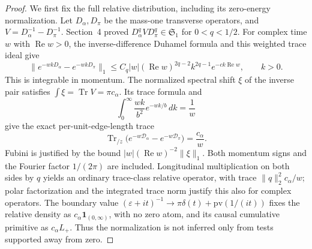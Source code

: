 \documentclass[11pt]{amsart}
\numberwithin{equation}{section}
\theoremstyle{remark}
\newcommand{\Tr}{\operatorname{Tr}}
\newcommand{\one}{\mathbf{1}}
\newcommand{\Sone}{\mathfrak{S}_1}
\newcommand{\Dcal}{\mathcal{D}}
\begin{document}
\begin{proof}
We first fix the full relative distribution, including its zero-energy normalization. Let $D_\alpha,D_\pi$ be the mass-one transverse operators, and $V=D_\alpha^{-1}-D_\pi^{-1}$. Section~4 proved $D^q_\alpha VD^q_\pi\in\Sone$ for $0<q<1/2$. For complex time $w$ with $\operatorname{Re}w>0$, the inverse-difference Duhamel formula and this weighted trace ideal give
\begin{equation}\label{eq:complexheat}
\|e^{-wkD_\alpha}-e^{-wkD_\pi}\|_1\le C_q|w|(\operatorname{Re}w)^{2q-2}k^{2q-1}e^{-ck\operatorname{Re}w},\qquad k>0 .
\end{equation}
This is integrable in momentum. The normalized spectral shift $\xi$ of the inverse pair satisfies $\int\xi=\Tr V=\pi c_\alpha$. Its trace formula and
\begin{equation}\label{eq:kintegral}
\int_0^\infty\frac{wk}{b^2}e^{-wk/b}\,dk=\frac1w
\end{equation}
give the exact per-unit-edge-length trace
\begin{equation}\label{eq:pertrace}
\Tr_{/z}\big(e^{-w\Dcal_\alpha}-e^{-w\Dcal_\pi}\big)=\frac{c_\alpha}{w} .
\end{equation}
Fubini is justified by the bound $|w|(\operatorname{Re}w)^{-2}\|\xi\|_1$. Both momentum signs and the Fourier factor $1/(2\pi)$ are included. Longitudinal multiplication on both sides by $q$ yields an ordinary trace-class relative operator, with trace $\|q\|_2^2c_\alpha/w$; polar factorization and the integrated trace norm justify this also for complex operators. The boundary value $(\varepsilon+it)^{-1}\to\pi\delta(t)+\mathrm{pv}(1/(it))$ fixes the relative density as $c_\alpha\one_{(0,\infty)}$, with no zero atom, and its causal cumulative primitive as $c_\alpha L_+$. Thus the normalization is not inferred only from tests supported away from zero.


\end{proof}
\end{document}
